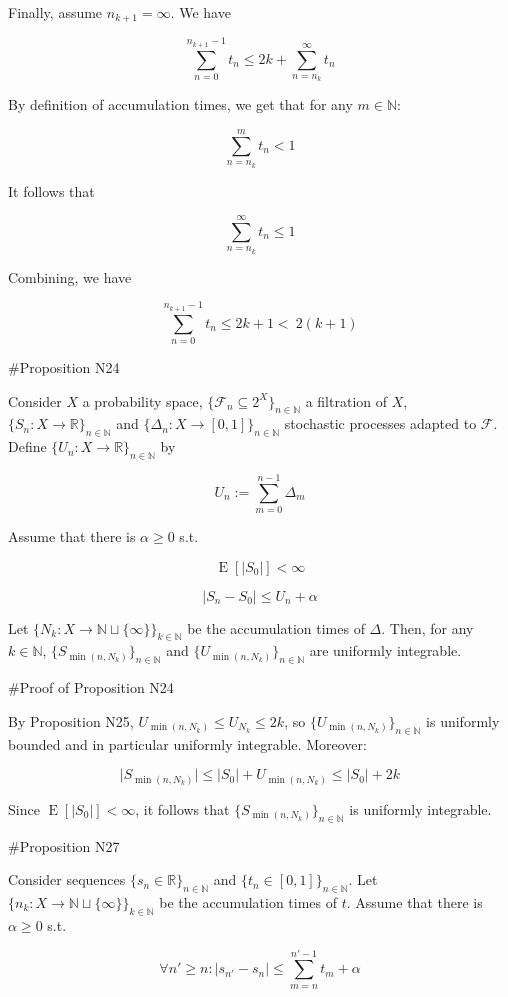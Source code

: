 \documentclass[a4paper]{article}
\DeclareMathOperator{\E}{E}
\newcommand{\Nats}{\mathbb{N}}
\newcommand{\Reals}{\mathbb{R}}
\newcommand{\Sq}[2]{\{#1\}_{#2 \in \Nats}}
\newcommand{\Sqn}[1]{\Sq{#1}{n}}
\newcommand{\Abs}[1]{\lvert #1 \rvert}
\newcommand{\F}{\mathcal{F}}
\begin{document}
Finally, assume ${n_{k+1} = \infty}$. We have

$$\sum_{n = 0}^{n_{k+1} - 1} t_n \leq 2k + \sum_{n = n_k}^{\infty} t_n$$

By definition of accumulation times, we get that for any ${m \in \Nats}$:

$$\sum_{n = n_k}^{m} t_n < 1$$

It follows that

$$\sum_{n = n_k}^{\infty} t_n \leq 1$$

Combining, we have

$$\sum_{n = 0}^{n_{k+1} - 1} t_n \leq 2k+1 <\ 2(k+1)$$

\#Proposition N24

Consider ${X}$ a probability space, ${\{\F_n \subseteq 2^X\}_{n \in \Nats}}$ a filtration of ${X}$, ${\{S_n:X \rightarrow \Reals\}_{n \in \Nats}}$ and ${\{\Delta_n:X \rightarrow [0,1]\}_{n \in \Nats}}$ stochastic processes adapted to ${\F}$. Define ${\Sqn{U_n: X \rightarrow \Reals}}$ by

$$U_n := \sum_{m=0}^{n-1} \Delta_m$$

Assume that there is ${\alpha \geq 0}$ s.t.

$$\E[\Abs{S_0}] < \infty$$

$$\Abs{S_{n}-S_0} \leq U_n + \alpha$$

Let ${\{N_k: X \rightarrow \Nats \sqcup \{\infty\}\}_{k \in \Nats}}$ be the accumulation times of ${\Delta}$. Then, for any ${k \in \Nats}$, ${\Sqn{S_{\min(n,N_k)}}}$ and ${\Sqn{U_{\min(n,N_k)}}}$ are uniformly integrable.

\#Proof of Proposition N24

By Proposition N25, $U_{\min(n,N_k)} \leq U_{N_k} \leq 2k$, so ${\Sqn{U_{\min(n,N_k)}}}$ is uniformly bounded and in particular uniformly integrable. Moreover:

$$\Abs{S_{\min(n,N_k)}} \leq \Abs{S_0} + U_{\min(n,N_k)} \leq \Abs{S_0} + 2k$$

Since ${\E[\Abs{S_0}] < \infty}$, it follows that ${\Sqn{S_{\min(n,N_k)}}}$ is uniformly integrable.

\#Proposition N27

Consider sequences ${\Sqn{s_n \in \Reals}}$ and ${\Sqn{t_n \in [0,1]}}$. Let ${\{n_k: X \rightarrow \Nats \sqcup \{\infty\}\}_{k \in \Nats}}$ be the accumulation times of ${t}$. Assume that there is ${\alpha \geq 0}$ s.t.

$${\forall n' \geq n: \Abs{s_{n'} - s_n} \leq \sum_{m=n}^{n'-1} t_m + \alpha}$$
\end{document}
